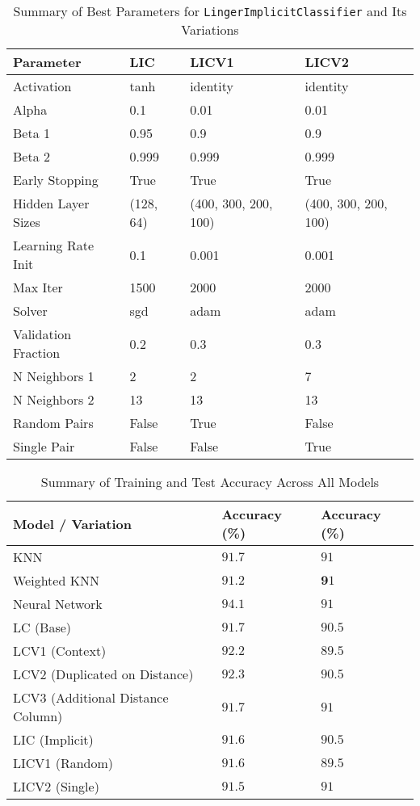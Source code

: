 \documentclass[a4paper, 12pt]{report}
\begin{document}
\begin{table}[H]
    \centering
    \caption{Summary of Best Parameters for \texttt{LingerImplicitClassifier} and Its Variations}
    \label{tab:best_parameters_LIC_variations_exp3}
    \footnotesize
    \begin{tabular}{|l|l|l|l|}
    \hline
    \textbf{Parameter} & \textbf{LIC} & \textbf{LICV1} & \textbf{LICV2} \\
    \hline
    Activation & tanh & identity & identity \\
    Alpha & 0.1 & 0.01 & 0.01 \\
    Beta 1 & 0.95 & 0.9 & 0.9 \\
    Beta 2 & 0.999 & 0.999 & 0.999 \\
    Early Stopping & True & True & True \\
    Hidden Layer Sizes & (128, 64) & (400, 300, 200, 100) & (400, 300, 200, 100) \\
    Learning Rate Init & 0.1 & 0.001 & 0.001 \\
    Max Iter & 1500 & 2000 & 2000 \\
    Solver & sgd & adam & adam \\
    Validation Fraction & 0.2 & 0.3 & 0.3 \\
    N Neighbors 1 & 2 & 2 & 7 \\
    N Neighbors 2 & 13 & 13 & 13 \\
    Random Pairs & False & True & False \\
    Single Pair & False & False & True \\
    \hline
    \end{tabular}
    \end{table}
\clearpage

\begin{table}[H]
    \centering
    \caption{Summary of Training and Test Accuracy Across All Models}
    \label{tab:summary_accuracy_all_models_exp3}
    \begin{tabular}{|l|l|l|}
    \toprule
    \textbf{Model / Variation} & \textbf{Accuracy (\%)} & \textbf{Accuracy (\%)} \\
    \midrule
    KNN & $91.7$ & $91$ \\
    Weighted KNN & $91.2$ & $\mathbf91$ \\
    Neural Network & $94.1$ & $91$ \\
    LC (Base) & $91.7$ & $90.5$ \\
    LCV1 (Context) & $92.2$ & $89.5$ \\
    LCV2 (Duplicated on Distance) & $92.3$ & $90.5$ \\
    LCV3 (Additional Distance Column) & $91.7$ & $91$ \\
    LIC (Implicit) & $91.6$ & $90.5$ \\
    LICV1 (Random) & $91.6$ & $89.5$ \\
    LICV2 (Single) & $91.5$ & $91$ \\
    \bottomrule
    \end{tabular}
\end{table}
\end{document}
